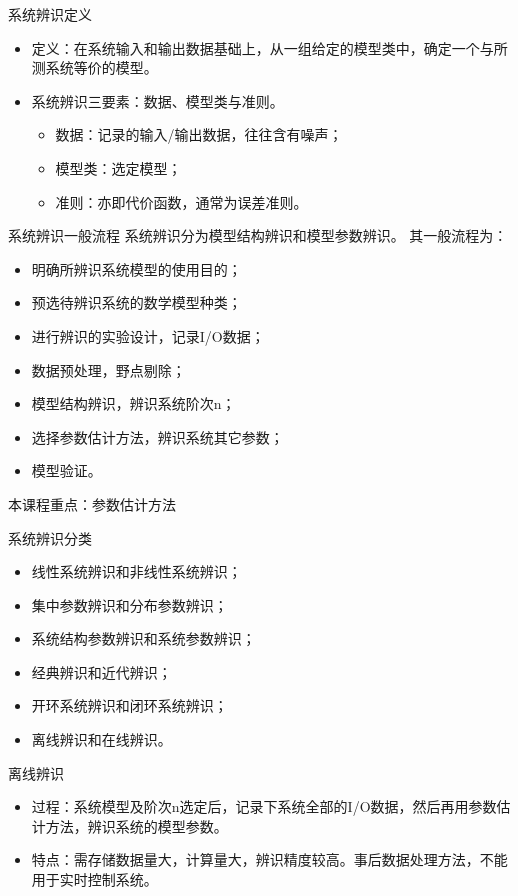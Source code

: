 \begin{frame}{系统辨识定义}
\begin{itemize}
\item    定义：在系统输入和输出数据基础上，从一组给定的模型类中，确定一个与所测系统等价的模型。
\item    系统辨识三要素：数据、模型类与准则。
\begin{itemize}
\item    数据：记录的输入/输出数据，往往含有噪声；
\item    模型类：选定模型；
\item    准则：亦即代价函数，通常为误差准则。
\end{itemize}
\end{itemize}
\end{frame}

\begin{frame}{系统辨识一般流程}
    系统辨识分为模型结构辨识和模型参数辨识。
其一般流程为：
\begin{itemize}
\item    明确所辨识系统模型的使用目的； 
\item    预选待辨识系统的数学模型种类；
\item    进行辨识的实验设计，记录I/O数据；
\item    数据预处理，野点剔除；
\item    模型结构辨识，辨识系统阶次n；
\item    选择参数估计方法，辨识系统其它参数；
\item    模型验证。
\end{itemize}
本课程重点：参数估计方法
\end{frame}

\begin{frame}{系统辨识分类}
\begin{itemize}
\item    线性系统辨识和非线性系统辨识； 
\item    集中参数辨识和分布参数辨识；
\item    系统结构参数辨识和系统参数辨识；
\item    经典辨识和近代辨识；
\item    开环系统辨识和闭环系统辨识；
\item    离线辨识和在线辨识。
\end{itemize}
\end{frame}

\begin{frame}{离线辨识}
\begin{itemize}
\item 过程：系统模型及阶次n选定后，记录下系统全部的I/O数据，然后再用参数估计方法，辨识系统的模型参数。
\item 特点：需存储数据量大，计算量大，辨识精度较高。事后数据处理方法，不能用于实时控制系统。
\end{itemize}
\end{frame}


